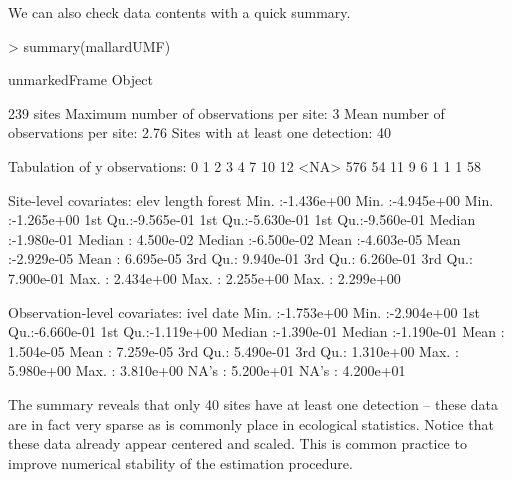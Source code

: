 \documentclass[article,shortnames]{jss}
\begin{document}
We can also check data contents with a quick summary.

\begin{Schunk}
\begin{Sinput}
> summary(mallardUMF)
\end{Sinput}
\begin{Soutput}
unmarkedFrame Object

239 sites
Maximum number of observations per site: 3 
Mean number of observations per site: 2.76 
Sites with at least one detection: 40 

Tabulation of y observations:
   0    1    2    3    4    7   10   12 <NA> 
 576   54   11    9    6    1    1    1   58 

Site-level covariates:
      elev                length               forest          
 Min.   :-1.436e+00   Min.   :-4.945e+00   Min.   :-1.265e+00  
 1st Qu.:-9.565e-01   1st Qu.:-5.630e-01   1st Qu.:-9.560e-01  
 Median :-1.980e-01   Median : 4.500e-02   Median :-6.500e-02  
 Mean   :-4.603e-05   Mean   :-2.929e-05   Mean   : 6.695e-05  
 3rd Qu.: 9.940e-01   3rd Qu.: 6.260e-01   3rd Qu.: 7.900e-01  
 Max.   : 2.434e+00   Max.   : 2.255e+00   Max.   : 2.299e+00  

Observation-level covariates:
      ivel                 date           
 Min.   :-1.753e+00   Min.   :-2.904e+00  
 1st Qu.:-6.660e-01   1st Qu.:-1.119e+00  
 Median :-1.390e-01   Median :-1.190e-01  
 Mean   : 1.504e-05   Mean   : 7.259e-05  
 3rd Qu.: 5.490e-01   3rd Qu.: 1.310e+00  
 Max.   : 5.980e+00   Max.   : 3.810e+00  
 NA's   : 5.200e+01   NA's   : 4.200e+01  
\end{Soutput}
\end{Schunk}

The summary reveals that only 40 sites have at least one detection --
these data are in fact very sparse as is commonly place in ecological statistics.
Notice that these data already appear centered and scaled.  This is
common practice to improve numerical stability of the estimation procedure.



\end{document}
